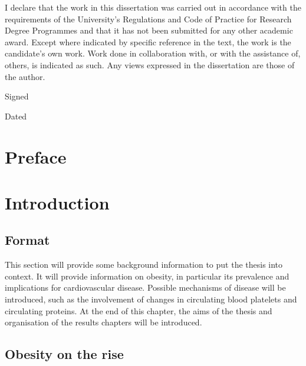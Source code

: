 \documentclass[11pt,twoside]{bristolthesis}
\begin{document}
  \begin{declaration}
    I declare that the work in this dissertation was carried out in accordance with the requirements of the University's Regulations and Code of Practice for Research Degree Programmes and that it has not been submitted for any other academic award. Except where indicated by specific reference in the text, the work is the candidate's own work. Work done in collaboration with, or with the assistance of, others, is indicated as such. Any views expressed in the dissertation are those of the author.

    \bigskip
    \bigskip
    \bigskip
    \bigskip
    \bigskip

    Signed

    \bigskip
    \bigskip
    \bigskip
    \bigskip
    \bigskip

    Dated
  \end{declaration}
  \hypersetup{linkcolor=black}
  \setcounter{tocdepth}{3}
  \tableofcontents
  \listoftables
  \listoffigures

\mainmatter %
\pagestyle{plain}
\hypertarget{preface}{%
\chapter*{Preface}\label{preface}}

\hypertarget{introduction}{%
\chapter{Introduction}\label{introduction}}

\hypertarget{format}{%
\section{Format}\label{format}}

This section will provide some background information to put the thesis into context. It will provide information on obesity, in particular its prevalence and implications for cardiovascular disease. Possible mechanisms of disease will be introduced, such as the involvement of changes in circulating blood platelets and circulating proteins. At the end of this chapter, the aims of the thesis and organisation of the results chapters will be introduced.

\hypertarget{obesity-on-the-rise}{%
\section{Obesity on the rise}\label{obesity-on-the-rise}}
\end{document}
